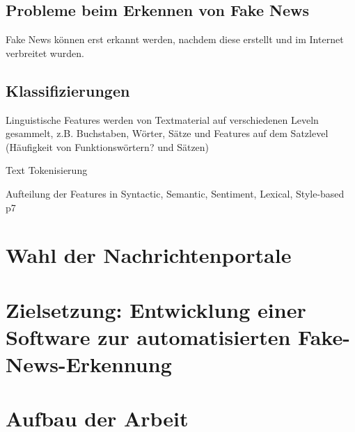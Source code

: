 
\subsection{Probleme beim Erkennen von Fake News}

Fake News können erst erkannt werden, nachdem diese erstellt und im Internet verbreitet wurden. \cite{Sharma:2024}

\subsection{Klassifizierungen}

Linguistische Features werden von Textmaterial auf verschiedenen Leveln gesammelt, z.B. Buchstaben, Wörter, Sätze 
und Features auf dem Satzlevel (Häufigkeit von Funktionswörtern? und Sätzen) \cite{secrypt17}

Text Tokenisierung \cite{Wagner:2010aa}

Aufteilung der Features in Syntactic, Semantic, Sentiment, Lexical, Style-based \cite{Sharma:2024}p7

\section{Wahl der Nachrichtenportale}
\label{sec:wahl_nachrichtenportale}

\section{Zielsetzung: Entwicklung einer Software zur automatisierten Fake-News-Erkennung}
\label{sec:zielsetzung}

\section{Aufbau der Arbeit}
\label{sec:aufbau}


